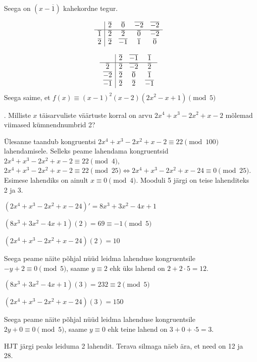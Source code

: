 \documentclass[a4paper, 10pt]{article}
\newcommand{\w}{\overline}
\begin{document}
Seega on $(x-\w{1})$ kahekordne tegur.

\begin{equation*}
\begin{array}{c| c c c c }
&\w{2}&\w{0}&\w{-2}&\w{-2}\\
\hline
\w{1}&\w{2}&\w{2}&\w{0}&\w{-2}\\
\w{2}&\w{2}&\w{-1}&\w{1}&\w{0}\\

\end{array}
\end{equation*}

\begin{equation*}
\begin{array}{c| c c c }
&\w{2}&\w{-1}&\w{1}\\
\hline
\w{2}&\w{2}&\w{-2}&\w{2}\\
\w{-2}&\w{2}&\w{0}&\w{1}\\
\w{-1}&\w{2}&\w{2}&\w{-1}\\

\end{array}
\end{equation*}
Seega saime, et $f(x)\equiv (x-1)^2(x-2)(2x^2-x+1)\pmod{5}$
\bigskip

\pagebreak
{}. Milliste $x$ täisarvuliste väärtuste korral on arvu $2x^4+x^3-2x^2+x-2$ mõlemad viimased kümnendnumbrid 2?

\bigskip
Ülesanne taandub kongruentsi $2x^4+x^3-2x^2+x-2\equiv 22 \pmod{100}$ lahendamisele. Selleks peame lahendama kongruentsid $2x^4+x^3-2x^2+x-2\equiv 22 \pmod{4}$, $2x^4+x^3-2x^2+x-2\equiv 22 \pmod{25}\Leftrightarrow 2x^4+x^3-2x^2+x-24\equiv 0 \pmod{25}$. Esimese lahendiks on ainult $x\equiv 0 \pmod{4}$. Mooduli 5 järgi on teise lahenditeks 2 ja 3. 

$(2x^4+x^3-2x^2+x-24)'=8x^3+3x^2-4x+1$

$(8x^3+3x^2-4x+1)(2)=69\equiv -1 \pmod{5} $

$(2x^4+x^3-2x^2+x-24)(2)=10$

Seega peame näite põhjal nüüd leidma lahenduse kongruentsile $-y+2\equiv0 \pmod{5}$, saame $y\equiv2$ ehk üks lahend on $2+2\cdot 5=12$.

$(8x^3+3x^2-4x+1)(3)=232\equiv 2 \pmod{5} $

$(2x^4+x^3-2x^2+x-24)(3)=150$

Seega peame näite põhjal nüüd leidma lahenduse kongruentsile $2y+0\equiv0 \pmod{5}$, saame $y\equiv0$ ehk teine lahend on $3+0+\cdot 5=3$.

HJT järgi peaks leiduma 2 lahendit. Terava silmaga näeb ära, et need on 12 ja 28.
\bigskip
\end{document}
